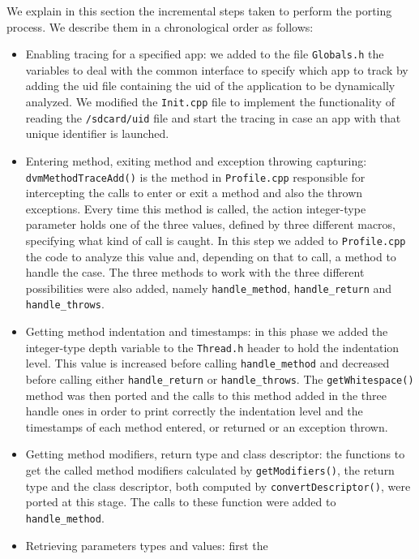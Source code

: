 We explain in this section the incremental steps taken to perform the
porting process. We describe them in a chronological order as follows:
\begin{itemize}
  \item Enabling tracing for a specified app: we added to the file
    \texttt{Globals.h} the variables to deal with the common interface
    to specify which app to track by adding the uid file containing
    the uid of the application to be dynamically analyzed. We modified
    the \texttt{Init.cpp} file to implement the functionality of
    reading the \texttt{/sdcard/uid} file and start the tracing in
    case an app with that unique identifier is launched.
  \item Entering method, exiting method and exception throwing
    capturing: \texttt{dvmMethodTraceAdd()} is the method in
    \texttt{Profile.cpp} responsible for intercepting the calls to
    enter or exit a method and also the thrown exceptions. Every time
    this method is called, the action integer-type parameter holds one
    of the three values, defined by three different macros, specifying
    what kind of call is caught. In this step we added to
    \texttt{Profile.cpp} the code to analyze this value and, depending
    on that to call, a method to handle the case. The three methods to
    work with the three different possibilities were also added,
    namely \texttt{handle\_method}, \texttt{handle\_return} and
    \texttt{handle\_throws}.
  \item Getting method indentation and timestamps: in this phase we
    added the integer-type depth variable to the \texttt{Thread.h}
    header to hold the indentation level. This value is increased
    before calling \texttt{handle\_method} and decreased before
    calling either \texttt{handle\_return} or
    \texttt{handle\_throws}. The \texttt{getWhitespace()} method was
    then ported and the calls to this method added in the three handle
    ones in order to print correctly the indentation level and the
    timestamps of each method entered, or returned or an exception
    thrown.
  \item Getting method modifiers, return type and class descriptor:
    the functions to get the called method modifiers calculated by
    \texttt{getModifiers()}, the return type and the class descriptor, both
    computed by \texttt{convertDescriptor()}, were ported at this stage. The
    calls to these function were added to \texttt{handle\_method}.
  \item Retrieving parameters types and values: first the

\end{itemize}
